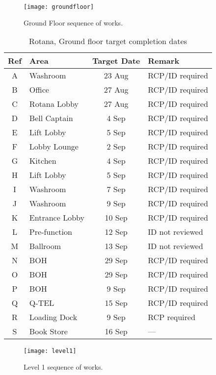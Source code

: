 \begin{figure*}[htbp]
 \texttt{[image: groundfloor]}
  \caption{Ground Floor sequence of works.}
  \label{fig:GRsequence}
\end{figure*}
\newcommand{\rcp}{RCP/ID required }
\begin{table}[htbp]
\begin{center}
\begin{tabular}{clcl}
\toprule
Ref &Area  & Target Date & Remark\\
\midrule
A       &Washroom & 23 Aug &\rcp  \\
B       &Office & 27 Aug  &\rcp\\
C      & Rotana Lobby & 27 Aug &\rcp\\
D      & Bell Captain & 4 Sep &\rcp\\
E      &Lift Lobby & 5 Sep &\rcp\\
F      &Lobby Lounge & 2 Sep & \rcp  \\
G     & Kitchen  & 4 Sep &\rcp\\
H     &Lift Lobby& 5 Sep &\rcp\\
I    &Washroom & 7 Sep &\rcp\\
J    &Washroom & 9 Sep &\rcp\\
K     &Entrance Lobby & 10 Sep&\rcp \\
L     &Pre-function &12 Sep &ID not reviewed\\
M    &Ballroom & 13 Sep &ID not reviewed\\
N &BOH &29 Sep &\rcp \\
O &BOH &29 Sep &\rcp \\
P &BOH  &9 Sep &\rcp \\
Q &Q-TEL  &15 Sep &\rcp \\
R &Loading Dock &9 Sep &RCP required\\
S &Book Store &16 Sep & --- \\
\bottomrule
\end{tabular}
\caption{Rotana,  Ground floor  target completion dates}
\end{center}
\end{table}




\begin{figure*}[htbp]
 \texttt{[image: level1]}
  \caption{Level 1 sequence of works.}
  \label{fig:level1}
\end{figure*}








